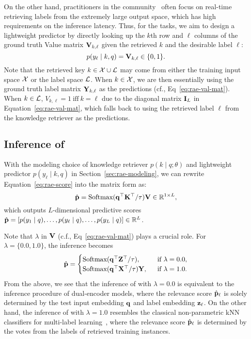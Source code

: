 On the other hand, practitioners in the \XMC community~\citep{etter2021accelerating,yu2022pecos} often focus on real-time retrieving labels from the extremely large output space, which has high requirements on the inference latency.
Thus, for the \XMC tasks, we aim to design a lightweight predictor by directly looking up the $k$th row and $\ell$ columns of the ground truth Value matrix ${\mathbf{V}}_{k,\ell}$ given the retrieved $k$ and the desirable label $\ell$:
\begin{equation}
    p(y_\ell  \mid  k, q) = {\mathbf{V}}_{k,\ell} \in \{0, 1\}.
\end{equation}
Note that the retrieved key $k \in {\mathcal{X}} \cup {\mathcal{L}}$ may come from either the training input space ${\mathcal{X}}$ or the label space ${\mathcal{L}}$.
When $k \in {\mathcal{X}}$, we are then essentially using the ground truth label matrix ${\mathbf{Y}}_{k,\ell}$ as the predictions (cf., Eq~\ref{eq:rae-val-mat}).
When $k \in {\mathcal{L}}$, $V_{k,\ell} = 1 \ \text{iff} \ k = \ell$ due to the diagonal matrix ${\mathbf{I}}_L$ in Equation~\ref{eq:rae-val-mat}, which falls back to using the retrieved label $\ell$ from the knowledge retriever as the predictions. 


\subsection{Inference of \RAEXMC}
\label{sec:rae-inference}
With the modeling choice of knowledge retriever $p(k \mid q; \theta)$ and lightweight predictor $p(y_\ell \mid k, q)$ in Section~\ref{sec:rae-modeling},
we can rewrite Equation~\ref{eq:rae-score} into the matrix form as:
\begin{equation}
    \hat{{\mathbf{p}}}
    = \text{Softmax}({\mathbf{q}}^\top {\mathbf{K}}^\top / \tau) {\mathbf{V}} \in {\mathbb{R}}^{1 \times L},
    \label{eq:rae-inference-exact}
\end{equation}
which outputs $L$-dimensional predictive scores $\hat{{\mathbf{p}}} = [p(y_1 \mid q), \ldots, p(y_\ell \mid q), \ldots, p(y_L \mid q)] \in {\mathbb{R}}^L$.

Note that $\lambda$ in ${\mathbf{V}}$ (c.f., Eq~\ref{eq:rae-val-mat}) plays a crucial role.
For $\lambda = \{0.0, 1.0\}$, the inference becomes
\begin{equation}
    \hat{{\mathbf{p}}} =
    \begin{cases}
        \text{Softmax}({\mathbf{q}}^\top {\mathbf{Z}}^\top / \tau)    , & \ \text{ if } \lambda = 0.0, \\
        \text{Softmax}({\mathbf{q}}^\top {\mathbf{X}}^\top / \tau){\mathbf{Y}}, & \ \text{ if } \lambda = 1.0.
    \end{cases}
    \label{eq:rase-inference-lambda}
\end{equation}
From the above, we see that the inference of \RAEXMC with $\lambda=0.0$ is equivalent to the inference procedure of dual-encoder models, where the relevance score $\hat{{\mathbf{p}}}_\ell$ is solely determined by the test input embedding ${\mathbf{q}}$ and label embedding ${\mathbf{z}}_\ell$.
On the other hand, the inference of \RAEXMC with $\lambda=1.0$ resembles the classical non-parametric kNN classifiers for multi-label learning~\citep{zhang2007ml},
where the relevance score $\hat{{\mathbf{p}}}_{\ell}$ is determined by the votes from the labels of retrieved training instances.

